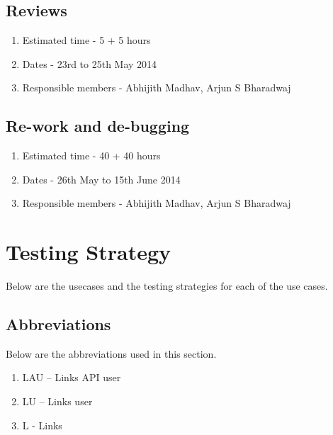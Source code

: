 \documentclass[11pt]{report} %
\begin{document}
\subsection*{Reviews}
\begin{enumerate}
\item Estimated time - 5 + 5 hours
\item Dates - 23rd to 25th May 2014
\item Responsible members - Abhijith Madhav, Arjun S Bharadwaj
\end{enumerate}
\subsection*{Re-work and de-bugging}
\begin{enumerate}
\item Estimated time - 40 + 40 hours
\item Dates - 26th May to 15th June 2014
\item Responsible members - Abhijith Madhav, Arjun S Bharadwaj
\end{enumerate}



\maketitle
\section*{Testing Strategy}
Below are the usecases and the testing strategies for each of the use cases.

\subsection*{Abbreviations}
Below are the abbreviations used in this section.
\begin{enumerate}
	\item
		LAU – Links API user
	\item
		LU – Links user
	\item
		L - Links
\end{enumerate}
\end{document}
